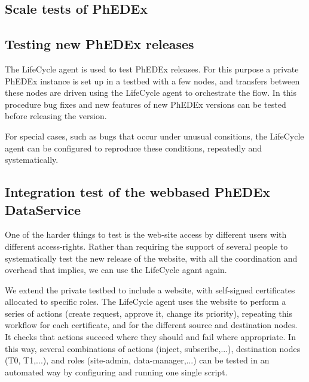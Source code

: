 \subsection{Scale tests of PhEDEx}


\subsection{Testing new PhEDEx releases}

The LifeCycle agent is used to test PhEDEx releases. For this purpose a
private PhEDEx instance is set up in a testbed with a few nodes, and transfers
between these nodes are driven using the LifeCycle agent to orchestrate the
flow. In this procedure bug fixes and new features of new PhEDEx versions can
be tested before releasing the version. 

For special cases, such as bugs that occur under unusual consitions, the
LifeCycle agent can be configured to reproduce these conditions, repeatedly
and systematically.


\subsection{Integration test of the webbased PhEDEx DataService}


One of the harder things to test is the web-site access by different users
with different access-rights. Rather than requiring the support of several
people to systematically test the new release of the website, with all the
coordination and overhead that implies, we can use the LifeCycle agant again.

We extend the private testbed to include a website, with self-signed
certificates allocated to specific roles. The LifeCycle agent uses the website
to perform a series of actions (create request, approve it, change its
priority), repeating this workflow for each certificate, and for the different
source and destination nodes. It checks that actions succeed where they should
and fail where appropriate. In this way, several combinations of actions
(inject, subscribe,...), destination nodes (T0, T1,...), and roles
(site-admin, data-manager,...) can be tested in an automated way by
configuring and running one single script.


